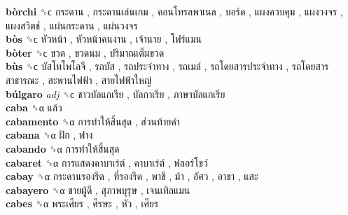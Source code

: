 \textbf{bòrchi} ␝ϲ   กระดาน ,  กระดานเล่นเกม ,  คอนโทรลพาเนล ,  บอร์ด ,  แผงควบคุม ,  แผงวงจร ,  แผงสวิตช์ ,  แผ่นกระดาน ,  แผ่นวงจร   \\
\textbf{bòs} ␝ϲ   หัวหน้า ,  หัวหน้าคนงาน ,  เจ้านาย ,  โฟร์แมน   \\
\textbf{bòter} ␝ϲ   ขวด ,  ขวดนม ,  ปริมาณเต็มขวด   \\
\textbf{bùs} ␝ϲ   บัสโทโพโลจี ,  รถบัส ,  รถประจำทาง ,  รถเมล์ ,  รถโดยสารประจำทาง ,  รถโดยสารสาธารณะ ,  สะพานไฟฟ้า ,  สายไฟฟ้าใหญ่   \\
\textbf{búlgaro} \emph{adj}  ␝ϲ   ชาวบัลแกเรีย ,  บัลกาเรีย ,  ภาษาบัลแกเรีย   \\
\textbf{caba} ␝α   แล้ว   \\
\textbf{cabamento} ␝α   การทำให้สิ้นสุด ,  ส่วนท้ายคำ   \\
\textbf{cabana} ␝α   ฝัก ,  ฟาง   \\
\textbf{cabando} ␝α   การทำให้สิ้นสุด   \\
\textbf{cabaret} ␝α   การแสดงคาบาเร่ต์ ,  คาบาเร่ต์ ,  ฟลอร์โชว์   \\
\textbf{cabay} ␝α   กระดานรองรีด ,  ที่รองรีด ,  พาชี ,  ม้า ,  อัศว ,  อาชา ,  แสะ   \\
\textbf{cabayero} ␝α   ชายผู้ดี ,  สุภาพบุรุษ ,  เจนเทิลแมน   \\
\textbf{cabes} ␝α   พระเศียร ,  ศีรษะ ,  หัว ,  เศียร   \\
